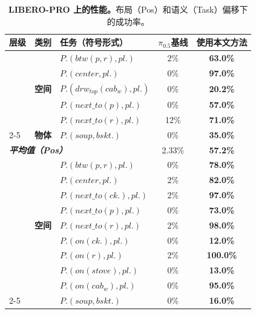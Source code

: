 \begin{table}[t]
  \centering
  \caption{\textbf{LIBERO-PRO 上的性能。}布局（Pos）和语义（Task）偏移下的成功率。}
  \label{tab:libero_pro}
  \small
  \addtolength{\tabcolsep}{-4pt}
  {
  \setlength{\aboverulesep}{0pt}
  \setlength{\belowrulesep}{0pt}
  \begin{tabular}{l|clcc}
    \toprule
    \rule{0pt}{3ex} \textbf{层级} & \textbf{类别} & \textbf{任务（符号形式）} & \textbf{$\pi_{0.5}$基线} & \textbf{使用本文方法} \\
    \midrule
    \rule{0pt}{2.5ex} \multirow{6}{*}{\textbf{Pos}} & \multirow{5}{*}{\textbf{空间}}
      & $P.(btw(p, r), pl.)$         & 2\%  & \textbf{63.0\%} \\
    & & $P.(center, pl.)$             & 0\%  & \textbf{97.0\%} \\
    & & $P.(drw_{top}(cab_{w}), pl.)$ & 0\%  & \textbf{20.2\%} \\
    & & $P.(next\_to(p), pl.)$        & 0\%  & \textbf{57.0\%} \\
    & & $P.(next\_to(r), pl.)$        & 12\% & \textbf{71.0\%} \\
    \cmidrule(l){2-5}
    & \rule{0pt}{2.5ex} \textbf{物体} & $P.(soup, bskt.)$ & 0\% & \textbf{35.0\%} \\
    \midrule
    \multicolumn{3}{l|}{\rule{0pt}{2.5ex} \textit{\textbf{平均值（Pos）}}} & 2.33\% & \textbf{57.2\%} \\
    \midrule
    \rule{0pt}{3ex} \multirow{14}{*}{\textbf{Task}} & \multirow{9}{*}{\textbf{空间}}
      & $P.(btw(p, r), pl.)$       & 0\% & \textbf{78.0\%} \\
    & & $P.(center, pl.)$           & 2\% & \textbf{82.0\%} \\
    & & $P.(next\_to(ck.), pl.)$    & 2\% & \textbf{97.0\%} \\
    & & $P.(next\_to(p), pl.)$     & 0\% & \textbf{73.0\%} \\
    & & $P.(next\_to(r), pl.)$     & 2\% & \textbf{98.0\%} \\
    & & $P.(on(ck.), pl.)$          & 0\% & \textbf{12.0\%} \\
    & & $P.(on(r), pl.)$            & 2\% & \textbf{100.0\%} \\
    & & $P.(on(stove), pl.)$        & 0\% & \textbf{13.0\%} \\
    & & $P.(on(cab_{w}), pl.)$      & 0\% & \textbf{95.0\%} \\
    \cmidrule(l){2-5}
    & \rule{0pt}{2.5ex} \multirow{5}{*}{\textbf{物体}}
      & $P.(soup, bskt.)$           & 0\% & \textbf{16.0\%} \\

\end{tabular}}
\end{table}
